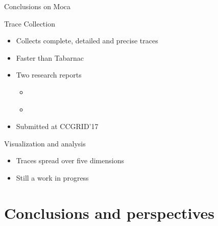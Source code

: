 \documentclass[xcolor={usenames,dvipsnames},hyperref={pdfusetitle}]{beamer}
\begin{document}
\begin{frame}{Conclusions on Moca}
    \begin{exampleblock}{Trace Collection}
        \begin{itemize}
            \item Collects complete, detailed and precise traces
            \item Faster than Tabarnac
            \item Two research reports
                \begin{itemize}
                    \item \cite{Beniamine15Memory}
                    \item \cite{Beniamine16Moca}
                \end{itemize}
            \item Submitted at CCGRID'17
        \end{itemize}
    \end{exampleblock}
    \pause
    \begin{block}{Visualization and analysis}
        \begin{itemize}
            \item<alert@1-> Traces spread over five dimensions
            \item Still a work in progress
        \end{itemize}
    \end{block}
\end{frame}

\section{Conclusions and perspectives}
\end{document}
